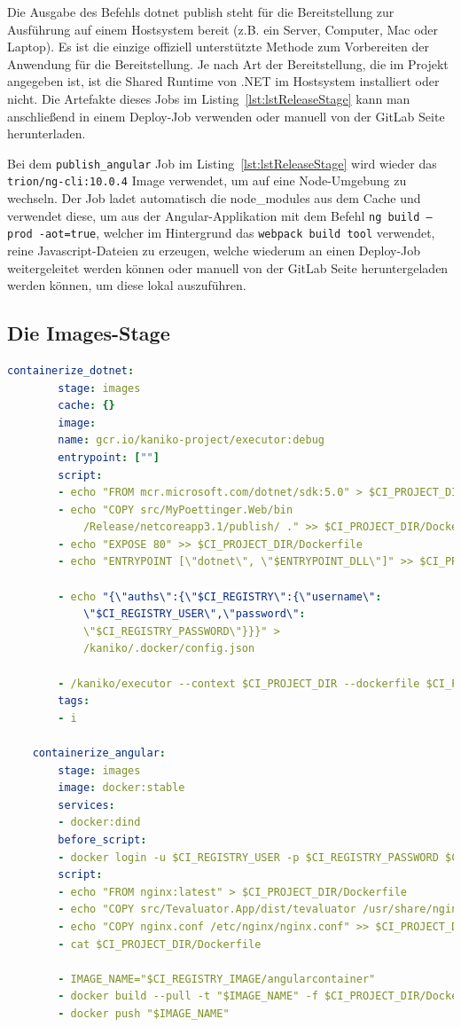 Die Ausgabe des Befehls dotnet publish steht für die Bereitstellung zur Ausführung auf einem Hostsystem bereit (z.B. ein Server, Computer, Mac oder Laptop). Es ist die einzige offiziell unterstützte Methode zum Vorbereiten der Anwendung für die Bereitstellung. Je nach Art der Bereitstellung, die im Projekt angegeben ist, ist die Shared Runtime von .NET im Hostsystem installiert oder nicht.\cite{dotnetpublish} Die Artefakte dieses Jobs im Listing~\ref{lst:lstReleaseStage} kann man anschließend in einem Deploy-Job verwenden oder manuell von der GitLab Seite herunterladen.

Bei dem \texttt{publish\_angular} Job im Listing~\ref{lst:lstReleaseStage} wird wieder das \texttt{trion/ng-cli:10.0.4} Image verwendet, um auf eine Node-Umgebung zu wechseln. Der Job ladet automatisch die node\_modules aus dem Cache und verwendet diese, um aus der Angular-Applikation mit dem Befehl \colorbox{MyLightGrayBackgroundForCode}{\texttt{ng build --prod -aot=true}}, welcher im Hintergrund das \texttt{webpack build tool} verwendet, reine Javascript-Dateien zu erzeugen, welche wiederum an einen Deploy-Job weitergeleitet werden können oder manuell von der GitLab Seite heruntergeladen werden können, um diese lokal auszuführen.

\newpage

\subsection{Die Images-Stage}

\begin{lstlisting}[caption={Die Images-Stage der gitlab-ci.yml Datei}, language=yaml, label={lst:lstImagesStage}]
	containerize_dotnet:
		stage: images
		cache: {}
		image:
		name: gcr.io/kaniko-project/executor:debug
		entrypoint: [""]
		script:
		- echo "FROM mcr.microsoft.com/dotnet/sdk:5.0" > $CI_PROJECT_DIR/Dockerfile
		- echo "COPY src/MyPoettinger.Web/bin
			/Release/netcoreapp3.1/publish/ ." >> $CI_PROJECT_DIR/Dockerfile
		- echo "EXPOSE 80" >> $CI_PROJECT_DIR/Dockerfile
		- echo "ENTRYPOINT [\"dotnet\", \"$ENTRYPOINT_DLL\"]" >> $CI_PROJECT_DIR/Dockerfile
		
		- echo "{\"auths\":{\"$CI_REGISTRY\":{\"username\":
			\"$CI_REGISTRY_USER\",\"password\":
			\"$CI_REGISTRY_PASSWORD\"}}}" >
		 	/kaniko/.docker/config.json
		
		- /kaniko/executor --context $CI_PROJECT_DIR --dockerfile $CI_PROJECT_DIR/Dockerfile --destination $CI_REGISTRY_IMAGE:$DOCKER_IMAGE_VERSION
		tags:
		- i
		
	containerize_angular:
		stage: images
		image: docker:stable
		services:
		- docker:dind
		before_script:
		- docker login -u $CI_REGISTRY_USER -p $CI_REGISTRY_PASSWORD $CI_REGISTRY
		script:
		- echo "FROM nginx:latest" > $CI_PROJECT_DIR/Dockerfile
		- echo "COPY src/Tevaluator.App/dist/tevaluator /usr/share/nginx/html" >> $CI_PROJECT_DIR/Dockerfile
		- echo "COPY nginx.conf /etc/nginx/nginx.conf" >> $CI_PROJECT_DIR/Dockerfile
		- cat $CI_PROJECT_DIR/Dockerfile
		
		- IMAGE_NAME="$CI_REGISTRY_IMAGE/angularcontainer"
		- docker build --pull -t "$IMAGE_NAME" -f $CI_PROJECT_DIR/Dockerfile .
		- docker push "$IMAGE_NAME"
\end{lstlisting}

